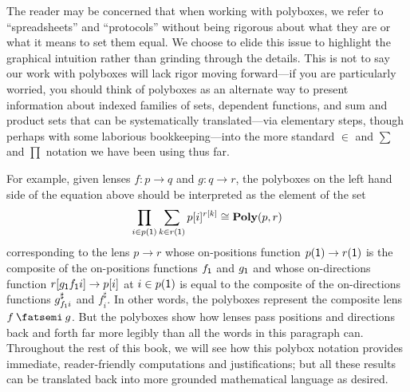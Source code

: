 \documentclass[Book-Poly]{subfiles}
\begin{document}
\begin{remark}
  The reader may be concerned that when working with polyboxes, we refer to ``spreadsheets'' and ``protocols'' without being rigorous about what they are or what it means to set them equal.
  We choose to elide this issue to highlight the graphical intuition rather than grinding through the details.
  This is not to say our work with polyboxes will lack rigor moving forward---if you are particularly worried, you should think of polyboxes as an alternate way to present information about indexed families of sets, dependent functions, and sum and product sets that can be systematically translated---via elementary steps, though perhaps with some laborious bookkeeping---into the more standard $\in$ and $\sum$ and $\prod$ notation we have been using thus far.

  For example, given lenses $f\colon p\to q$ and $g\colon q\to r$, the polyboxes on the left hand side of the equation above should be interpreted as the element of the set
  \[
    \prod_{i\in p(\textsf{1})}\sum_{k\in r(\textsf{1})}p[i]^{r[k]}\cong\mathbf{Poly}(p,r)
  \]
  corresponding to the lens $p\to r$ whose on-positions function $p(\textsf{1})\to r(\textsf{1})$ is the composite of the on-positions functions $f_{\textsf{1}}$ and $g_{\textsf{1}}$ and whose on-directions function $r[g_{\textsf{1}}f_{\textsf{1}}i]\to p[i]$ at $i\in p(\textsf{1})$ is equal to the composite of the on-directions functions $g^\sharp_{f_{\textsf{1}}i}$ and $f^\sharp_i$.
  In other words, the polyboxes represent the composite lens $f\then g$.
  But the polyboxes show how lenses pass positions and directions back and forth far more legibly than all the words in this paragraph can.
  Throughout the rest of this book, we will see how this polybox notation provides immediate, reader-friendly computations and justifications; but all these results can be translated back into more grounded mathematical language as desired.
\end{remark}
\end{document}
